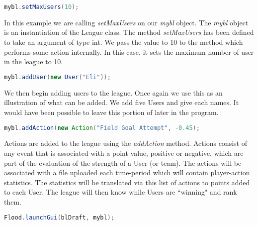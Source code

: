 \documentclass[12pt]{report}
\begin{document}
\begin{lstlisting}[language=Java,label=some-code,caption=Setting maximum users]
mybl.setMaxUsers(10);
\end{lstlisting}

\begin{doublespace}
In this example we are calling \textit{setMaxUsers} on our \textit{mybl} object. The \textit{mybl} object is an instantiation of the League class. The method \textit{setMaxUsers} has been defined to take an argument of type int. We pass the value to 10 to the method which performs some action internally. In this case, it sets the maximum number of user in the league to 10.
\end{doublespace}

\begin{lstlisting}[language=Java,label=some-code,caption=Adding a User]
mybl.addUser(new User("Eli"));
\end{lstlisting}

\begin{doublespace}
We then begin adding users to the league. Once again we use this as an illustration of what can be added. We add five Users and give each names. It would have been possible to leave this portion of later in the program.
\end{doublespace}

\begin{lstlisting}[language=Java,label=some-code,caption=Adding an Action]
mybl.addAction(new Action("Field Goal Attempt", -0.45);
\end{lstlisting}

\begin{doublespace}
Actions are added to the league using the \textit{addAction} method. Actions consist of any event that is associated with a point value, positive or negative, which are part of the evaluation of the strength of a User (or team). The actions will be associated with a file uploaded each time-period which will contain player-action statistics. The statistics will be translated via this list of actions to points added to each User. The league will then know while Users are ``winning" and rank them. 
\end{doublespace}

\begin{lstlisting}[language=Java,label=some-code,caption=Launching the GUI]
Flood.launchGui(blDraft, mybl);
\end{lstlisting}
\end{document}

